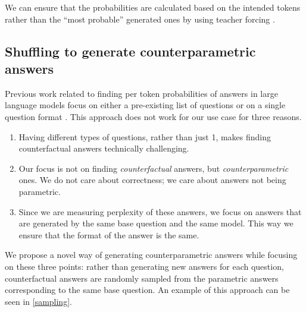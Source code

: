 We can ensure that the probabilities are calculated based on the intended tokens rather than the ``most probable'' generated ones by using teacher forcing \citep{teacher_forcing}.

\subsection{Shuffling to generate counterparametric answers}

Previous work related to finding per token probabilities of answers in large language models focus on either a pre-existing list of questions or on a single question format \citep{factual_recall}.
This approach does not work for our use case for three reasons.
\begin{enumerate}
	\item Having \baseqs{} different types of questions, rather than just 1, makes finding counterfactual answers technically challenging.
	\item Our focus is not on finding \emph{counterfactual} answers, but \emph{counterparametric} ones.
		We do not care about correctness; we care about answers not being parametric.
	\item Since we are measuring perplexity of these answers, we focus on answers that are generated by the same base question and the same model.
		This way we ensure that the format of the answer is the same.
\end{enumerate}

We propose a novel way of generating counterparametric answers while focusing on these three points: rather than generating new answers for each question, counterfactual answers are randomly sampled from the parametric answers corresponding to the same base question.
An example of this approach can be seen in \cref{sampling}.

